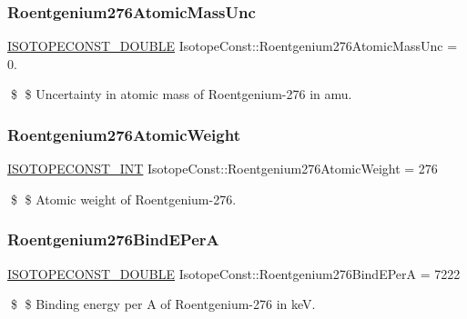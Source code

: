 \subsubsection{\texorpdfstring{Roentgenium276\+Atomic\+Mass\+Unc}{Roentgenium276AtomicMassUnc}}
{\footnotesize\ttfamily \mbox{\hyperlink{group___isotope_const-_macros_ga8f45a7272ce02c0b4c65c44636ed719a}{I\+S\+O\+T\+O\+P\+E\+C\+O\+N\+S\+T\+\_\+\+D\+O\+U\+B\+LE}} Isotope\+Const\+::\+Roentgenium276\+Atomic\+Mass\+Unc = 0.}

\$ \$ Uncertainty in atomic mass of Roentgenium-\/276 in amu. \mbox{\label{group___isotope_const-_roentgenium-_rg276_gaffe41aba83c2d24952cb55a6f6ffffca}} 
\subsubsection{\texorpdfstring{Roentgenium276\+Atomic\+Weight}{Roentgenium276AtomicWeight}}
{\footnotesize\ttfamily \mbox{\hyperlink{group___isotope_const-_macros_ga5f18360b3e99483a35c32d789e62621c}{I\+S\+O\+T\+O\+P\+E\+C\+O\+N\+S\+T\+\_\+\+I\+NT}} Isotope\+Const\+::\+Roentgenium276\+Atomic\+Weight = 276}

\$ \$ Atomic weight of Roentgenium-\/276. \mbox{\label{group___isotope_const-_roentgenium-_rg276_gaa916eb1b017017d0938bd7fd9822c0b7}} 
\subsubsection{\texorpdfstring{Roentgenium276\+Bind\+E\+PerA}{Roentgenium276BindEPerA}}
{\footnotesize\ttfamily \mbox{\hyperlink{group___isotope_const-_macros_ga8f45a7272ce02c0b4c65c44636ed719a}{I\+S\+O\+T\+O\+P\+E\+C\+O\+N\+S\+T\+\_\+\+D\+O\+U\+B\+LE}} Isotope\+Const\+::\+Roentgenium276\+Bind\+E\+PerA = 7222}

\$ \$ Binding energy per A of Roentgenium-\/276 in keV. \mbox{\label{group___isotope_const-_roentgenium-_rg276_ga0a3bcd6b4e37f5c5f625cd121b5e89c7}} 

